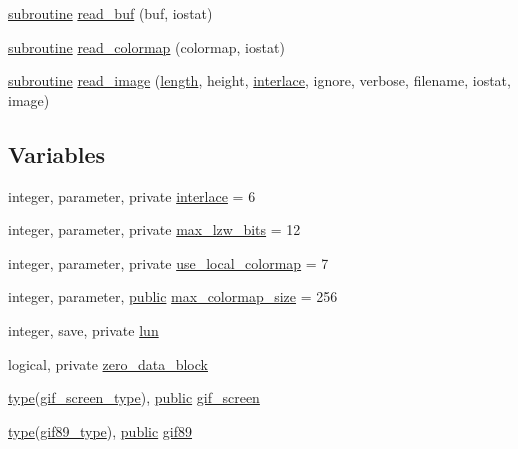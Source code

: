 \begin{DoxyCompactItemize}
\item 
\hyperlink{M__stopwatch_83_8txt_acfbcff50169d691ff02d4a123ed70482}{subroutine} \hyperlink{namespacem__readgif_a272a4dbcc1419d3d103db4c50b757805}{read\+\_\+buf} (buf, iostat)
\item 
\hyperlink{M__stopwatch_83_8txt_acfbcff50169d691ff02d4a123ed70482}{subroutine} \hyperlink{namespacem__readgif_aabaf13dcb1e665b2524049e5661ca4b6}{read\+\_\+colormap} (colormap, iostat)
\item 
\hyperlink{M__stopwatch_83_8txt_acfbcff50169d691ff02d4a123ed70482}{subroutine} \hyperlink{namespacem__readgif_a4af978d944dbefb3ddeb81cd8c54d0f9}{read\+\_\+image} (\hyperlink{M__stopwatch_83_8txt_a04ed5ef37abacfa36a856b5f30376485}{length}, height, \hyperlink{namespacem__readgif_af71b0131b0327843ab00d56288f1e4a3}{interlace}, ignore, verbose, filename, iostat, image)
\end{DoxyCompactItemize}
\subsection*{Variables}
\begin{DoxyCompactItemize}
\item 
integer, parameter, private \hyperlink{namespacem__readgif_af71b0131b0327843ab00d56288f1e4a3}{interlace} = 6
\item 
integer, parameter, private \hyperlink{namespacem__readgif_a42041a4cc2179d606ca9a1df44a797fe}{max\+\_\+lzw\+\_\+bits} = 12
\item 
integer, parameter, private \hyperlink{namespacem__readgif_abfef407c9bbae736ddf82dd2f5cc0dbc}{use\+\_\+local\+\_\+colormap} = 7
\item 
integer, parameter, \hyperlink{M__stopwatch_83_8txt_a2f74811300c361e53b430611a7d1769f}{public} \hyperlink{namespacem__readgif_a6bce6231298ac3b8c0fe89169eacf790}{max\+\_\+colormap\+\_\+size} = 256
\item 
integer, save, private \hyperlink{namespacem__readgif_ae5e05cba63ef3a16c27f9935d6c2a24d}{lun}
\item 
logical, private \hyperlink{namespacem__readgif_a3d4f20ed4d02e7e260b5e0bcae642ddd}{zero\+\_\+data\+\_\+block}
\item 
\hyperlink{stop__watch_83_8txt_a70f0ead91c32e25323c03265aa302c1c}{type}(\hyperlink{structm__readgif_1_1gif__screen__type}{gif\+\_\+screen\+\_\+type}), \hyperlink{M__stopwatch_83_8txt_a2f74811300c361e53b430611a7d1769f}{public} \hyperlink{namespacem__readgif_a6253fc469a2750e1d59bc498bca3d6eb}{gif\+\_\+screen}
\item 
\hyperlink{stop__watch_83_8txt_a70f0ead91c32e25323c03265aa302c1c}{type}(\hyperlink{structm__readgif_1_1gif89__type}{gif89\+\_\+type}), \hyperlink{M__stopwatch_83_8txt_a2f74811300c361e53b430611a7d1769f}{public} \hyperlink{namespacem__readgif_a1d5a3f008ce6a2b13029a0977dba1aa1}{gif89}
\end{DoxyCompactItemize}


